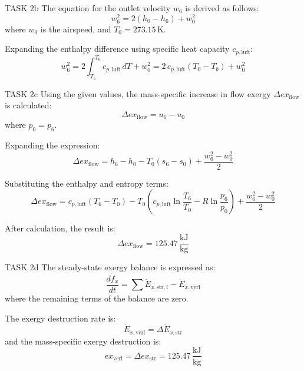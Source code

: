TASK 2b  
The equation for the outlet velocity \( w_6 \) is derived as follows:  
\[
w_6^2 = 2 \left( h_0 - h_6 \right) + w_0^2
\]  
where \( w_0 \) is the airspeed, and \( T_0 = 273.15 \, \text{K} \).  

Expanding the enthalpy difference using specific heat capacity \( c_{p,\text{luft}} \):  
\[
w_6^2 = 2 \int_{T_b}^{T_0} c_{p,\text{luft}} \, dT + w_0^2 = 2 \, c_{p,\text{luft}} \left( T_0 - T_b \right) + w_0^2
\]  

TASK 2c  
Using the given values, the mass-specific increase in flow exergy \( \Delta ex_{\text{flow}} \) is calculated:  
\[
\Delta ex_{\text{flow}} = u_6 - u_0
\]  
where \( p_0 = p_6 \).  

Expanding the expression:  
\[
\Delta ex_{\text{flow}} = h_6 - h_0 - T_0 \left( s_6 - s_0 \right) + \frac{w_6^2 - w_0^2}{2}
\]  

Substituting the enthalpy and entropy terms:  
\[
\Delta ex_{\text{flow}} = c_{p,\text{luft}} \left( T_6 - T_0 \right) - T_0 \left( c_{p,\text{luft}} \ln \frac{T_6}{T_0} - R \ln \frac{p_6}{p_0} \right) + \frac{w_6^2 - w_0^2}{2}
\]  

After calculation, the result is:  
\[
\Delta ex_{\text{flow}} = 125.47 \, \frac{\text{kJ}}{\text{kg}}
\]  

TASK 2d  
The steady-state exergy balance is expressed as:  
\[
\frac{d\dot{f}_x}{dt} = \sum \dot{E}_{x,\text{str},i} - \dot{E}_{x,\text{verl}}
\]  
where the remaining terms of the balance are zero.  

The exergy destruction rate is:  
\[
\dot{E}_{x,\text{verl}} = \Delta \dot{E}_{x,\text{str}}
\]  
and the mass-specific exergy destruction is:  
\[
ex_{\text{verl}} = \Delta ex_{\text{str}} = 125.47 \, \frac{\text{kJ}}{\text{kg}}
\]